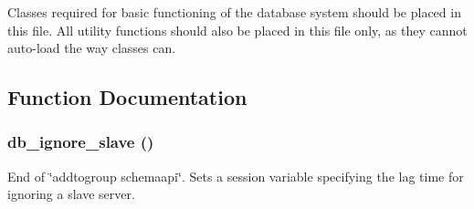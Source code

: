 Classes required for basic functioning of the database system should be placed in this file. All utility functions should also be placed in this file only, as they cannot auto-\/load the way classes can. 

\subsection{Function Documentation}
\hypertarget{database_8inc_a75131a7e4b6765eb3b31dcd82f064e9b}{
\subsubsection[{db\_\-ignore\_\-slave}]{\setlength{\rightskip}{0pt plus 5cm}db\_\-ignore\_\-slave ()}}
\label{database_8inc_a75131a7e4b6765eb3b31dcd82f064e9b}
End of \char`\"{}addtogroup schemaapi\char`\"{}. Sets a session variable specifying the lag time for ignoring a slave server. 